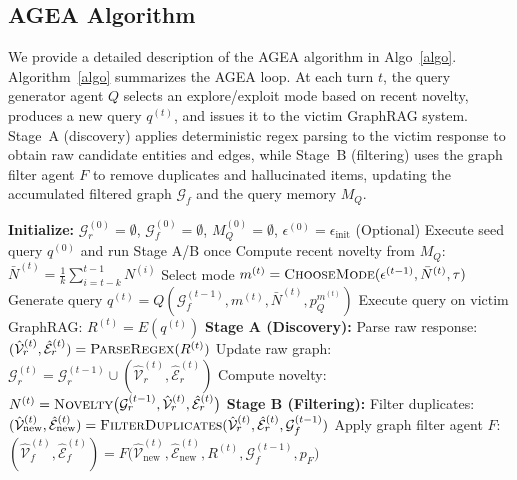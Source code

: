 \subsection{AGEA Algorithm}
\label{app: algo}
We provide a detailed description of the AGEA algorithm in Algo~\ref{algo}. Algorithm~\ref{algo} summarizes the AGEA loop. At each turn $t$, the query generator agent $Q$ selects an explore/exploit mode based on recent novelty, produces a new query $q^{(t)}$, and issues it to the victim GraphRAG system.
Stage~A (discovery) applies deterministic regex parsing to the victim response to obtain raw candidate entities and edges, while Stage~B (filtering) uses the graph filter agent $F$ to remove duplicates and hallucinated items, updating
the accumulated filtered graph $\mathcal{G}_f$ and the query memory $M_Q$.
\begin{algorithm*}[t!]
\caption{\textbf{AGEA} Algorithm}
\label{algo}
\begin{algorithmic}[1]
\STATE \textbf{Initialize:} $\mathcal{G}_r^{(0)} = \emptyset$, $\mathcal{G}_f^{(0)} = \emptyset$, $M_Q^{(0)} = \emptyset$, $\epsilon^{(0)} = \epsilon_{\text{init}}$
\STATE (Optional) Execute seed query $q^{(0)}$ and run Stage A/B once
    \STATE Compute recent novelty from $M_Q$: $\bar{N}^{(t)} = \tfrac{1}{k}\sum_{i=t-k}^{t-1} N^{(i)}$
    \STATE Select mode $m^{(t)} = \textsc{ChooseMode}(\epsilon^{(t-1)}, \bar{N}^{(t)}, \tau)$
    \STATE Generate query $q^{(t)} = Q(\mathcal{G}_f^{(t-1)}, m^{(t)}, \bar{N}^{(t)}, p_Q^{m^{(t)}})$
    \STATE Execute query on victim GraphRAG: $R^{(t)} = E(q^{(t)})$
    \STATE \textbf{Stage A (Discovery):} 
    \STATE\hspace{\algorithmicindent} Parse raw response: $(\hat{\mathcal{V}}_r^{(t)}, \hat{\mathcal{E}}_r^{(t)}) = \textsc{ParseRegex}(R^{(t)})$
    \STATE\hspace{\algorithmicindent} Update raw graph: $\mathcal{G}_r^{(t)} = \mathcal{G}_r^{(t-1)} \cup (\hat{\mathcal{V}}_r^{(t)}, \hat{\mathcal{E}}_r^{(t)})$
    \STATE\hspace{\algorithmicindent} Compute novelty: $N^{(t)} = \textsc{Novelty}\big(\mathcal{G}_r^{(t-1)}, \hat{\mathcal{V}}_r^{(t)}, \hat{\mathcal{E}}_r^{(t)}\big)$
    \STATE \textbf{Stage B (Filtering):} 
    \STATE\hspace{\algorithmicindent} Filter duplicates:
    $(\hat{\mathcal{V}}_{\text{new}}^{(t)}, \hat{\mathcal{E}}_{\text{new}}^{(t)}) = \textsc{FilterDuplicates}(\hat{\mathcal{V}}_r^{(t)}, \hat{\mathcal{E}}_r^{(t)}, \mathcal{G}_f^{(t-1)})$
    \STATE\hspace{\algorithmicindent} Apply graph filter agent $F$: $(\hat{\mathcal{V}}_f^{(t)}, \hat{\mathcal{E}}_f^{(t)}) = F\big(\hat{\mathcal{V}}_{\text{new}}^{(t)}, \hat{\mathcal{E}}_{\text{new}}^{(t)}, R^{(t)}, \mathcal{G}_f^{(t-1)}, p_F\big)$

\end{algorithmic}
\end{algorithm*}
